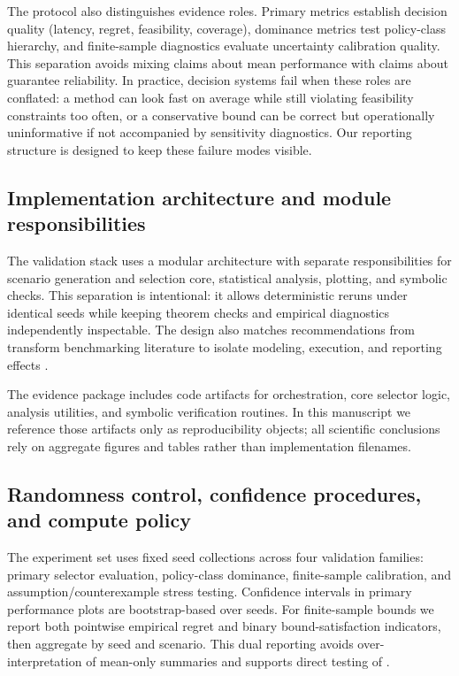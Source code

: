 \documentclass{article} %
\begin{document}
The protocol also distinguishes evidence roles. Primary metrics establish decision quality (latency, regret, feasibility, coverage), dominance metrics test policy-class hierarchy, and finite-sample diagnostics evaluate uncertainty calibration quality. This separation avoids mixing claims about mean performance with claims about guarantee reliability. In practice, decision systems fail when these roles are conflated: a method can look fast on average while still violating feasibility constraints too often, or a conservative bound can be correct but operationally uninformative if not accompanied by sensitivity diagnostics. Our reporting structure is designed to keep these failure modes visible.

\subsection{Implementation architecture and module responsibilities}
The validation stack uses a modular architecture with separate responsibilities for scenario generation and selection core, statistical analysis, plotting, and symbolic checks. This separation is intentional: it allows deterministic reruns under identical seeds while keeping theorem checks and empirical diagnostics independently inspectable. The design also matches recommendations from transform benchmarking literature to isolate modeling, execution, and reporting effects \citep{S03,S07,S09,S42}.

The evidence package includes code artifacts for orchestration, core selector logic, analysis utilities, and symbolic verification routines. In this manuscript we reference those artifacts only as reproducibility objects; all scientific conclusions rely on aggregate figures and tables rather than implementation filenames.

\subsection{Randomness control, confidence procedures, and compute policy}
The experiment set uses fixed seed collections across four validation families: primary selector evaluation, policy-class dominance, finite-sample calibration, and assumption/counterexample stress testing. Confidence intervals in primary performance plots are bootstrap-based over seeds. For finite-sample bounds we report both pointwise empirical regret and binary bound-satisfaction indicators, then aggregate by seed and scenario. This dual reporting avoids over-interpretation of mean-only summaries and supports direct testing of .
\end{document}
